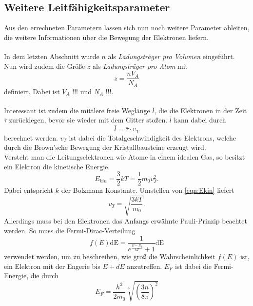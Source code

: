 \subsection{Weitere Leitfähigkeitsparameter}
Aus den errechneten Parametern lassen sich nun noch weitere Parameter ableiten, die weitere Informationen 
über die Bewegung der Elektronen liefern.\\\\
In dem letzten Abschnitt wurde $n$ als \textit{Ladungsträger pro Volumen} eingeführt. Nun wird zudem die 
Größe $z$ als \textit{Ladungsträger pro Atom} mit 
\begin{equation}
    z=\frac{n V_A}{N_A}\label{eqn:z}
\end{equation}
definiert. Dabei ist $V_A$ !!! und $N_A$ !!!.\\\\
Interessant ist zudem die mittlere freie Weglänge $\bar{l}$, die die Elektronen in der Zeit $\bar{\tau}$ zurücklegen, bevor
sie wieder mit dem Gitter stoßen. $\bar{l}$ kann dabei durch
\begin{equation*}
    \bar{l}=\bar{\tau}\cdot v_T
\end{equation*}
berechnet werden. $v_T$ ist dabei die Totalgeschwindigkeit des Elektrons, welche durch die Brown'sche Bewegung 
der Kristallbausteine erzeugt wird.\\
Versteht man die Leitungselektronen wie Atome in einem idealen Gas, so besitzt ein Elektron die kinetische Energie
\begin{equation}
    E_{kin}=\frac{3}{2}kT=\frac{1}{2}m_0v_T^2 . \label{eqn:Ekin}
\end{equation}
Dabei entspricht $k$ der Bolzmann Konstante. Umstellen von \eqref{eqn:Ekin} liefert
\begin{equation}
    v_T=\sqrt{\frac{3kT}{m_0}}. \label{eqn:vT1}
\end{equation}
Allerdings muss bei den Elektronen das Anfangs erwähnte Pauli-Prinzip beachtet werden. So muss die Fermi-Dirac-Verteilung
\begin{equation*}
    f(E)\text{dE}=\frac{1}{e^{\frac{E-E_f}{kT}}+1}\text{dE}
\end{equation*}
verwendet werden, um zu beschreiben, wie groß die Wahrscheinlichkeit $f(E)$ ist, ein 
Elektron mit der Engerie bis $E+dE$ anzutreffen. $E_F$ ist dabei die Fermi-Energie, die durch
\begin{equation}
    E_F=\frac{h^2}{2m_0}\sqrt[3]{\left(\frac{3n}{8\pi}\right)^2} \label{eqn:EF}
\end{equation}
